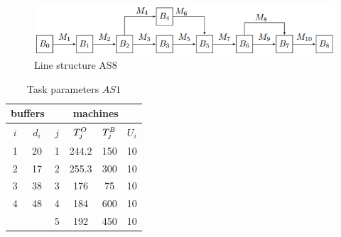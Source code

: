\documentclass{ifacconf}
\begin{document}
 \begin{figure}[h!]
	\centering
	\includegraphics[scale=0.55]{ans8}
  \caption{Line structure AS8} \label{fig:vis_as8}
  \end{figure}


\begin{table}[h!]
\centering
\small
\begin{tabular}{||c|c||c|c|c|c||}
\hline \multicolumn{2}{||c||}{buffers}&\multicolumn{4}{|c||}{machines}\\
\hline
$i$ & $d_i$ & $j$ & $T^{\rm O}_j$ & $T^{\rm B}_j$ & $U_i$\\
\hline
1 & 20 & 1 & 244.2 & 150 & 10\\
2 & 17 & 2 & 255.3 & 300 & 10\\
3 & 38 & 3 & 176 & 75 & 10\\
4 & 48 & 4 & 184 & 600 & 10\\
&& 5 & 192 & 450 & 10\\
\hline
\end{tabular}\\
\caption{Task parameters $\textit{AS1}$}\label{tabl:as1}
\end{table}
\end{document}
